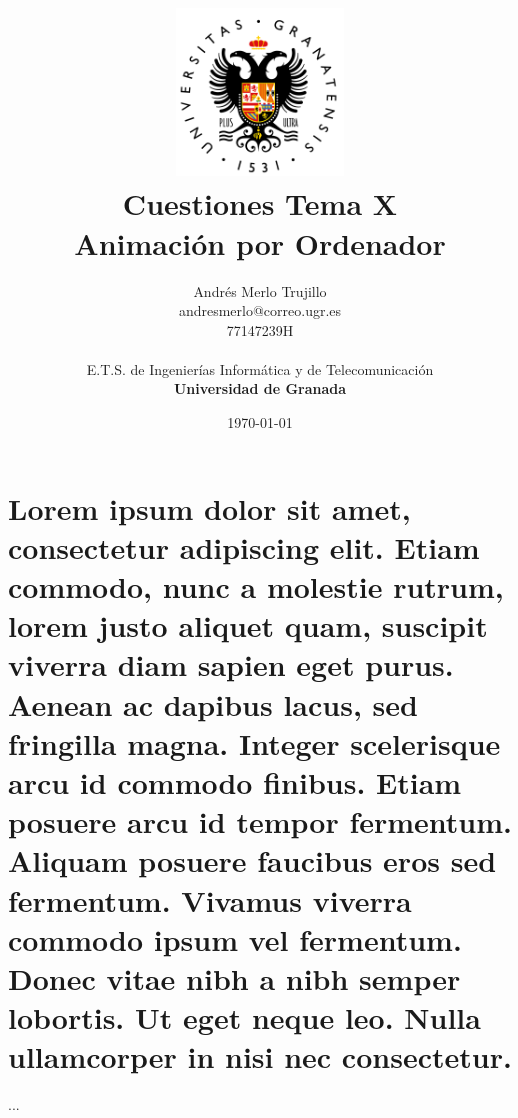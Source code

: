 \documentclass{article}
\title{
\includegraphics[width=1.75in]{imagenes/UGR-Logo.png} \\
\vspace*{1in}
\textbf{Cuestiones Tema X} \\
Animación por Ordenador \\
\vspace*{0.5in}}
\author{Andrés Merlo Trujillo \\
andresmerlo@correo.ugr.es \\
77147239H \\ 
\vspace*{0.5in} \\
E.T.S. de Ingenierías Informática y de Telecomunicación \\
\textbf{Universidad de Granada}} \date{\today}
\begin{document}
\begin{titlingpage}
\maketitle
\end{titlingpage}

\tableofcontents

\newpage

\pagestyle{fancy}   %

\section{Lorem ipsum dolor sit amet, consectetur adipiscing elit. Etiam commodo, nunc a molestie rutrum, lorem justo aliquet quam, suscipit viverra diam sapien eget purus. Aenean ac dapibus lacus, sed fringilla magna. Integer scelerisque arcu id commodo finibus. Etiam posuere arcu id tempor fermentum. Aliquam posuere faucibus eros sed fermentum. Vivamus viverra commodo ipsum vel fermentum. Donec vitae nibh a nibh semper lobortis. Ut eget neque leo. Nulla ullamcorper in nisi nec consectetur. }

...
\end{document}
